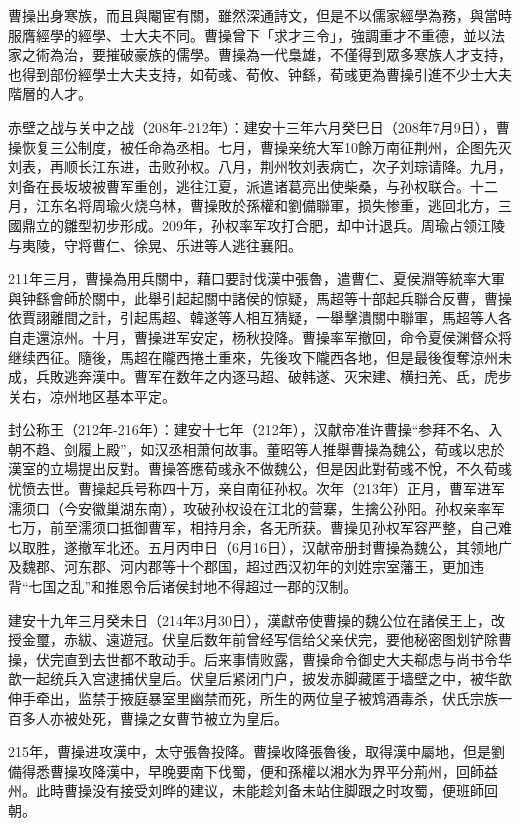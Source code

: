 曹操出身寒族，而且與閹宦有關，雖然深通詩文，但是不以儒家經學為務，與當時服膺經學的經學、士大夫不同。曹操曾下「求才三令」，強調重才不重德，並以法家之術為治，要摧破豪族的儒學。曹操為一代梟雄，不僅得到眾多寒族人才支持，也得到部份經學士大夫支持，如荀彧、荀攸、钟繇，荀彧更為曹操引進不少士大夫階層的人才。

赤壁之战与关中之战（208年-212年）：建安十三年六月癸巳日（208年7月9日），曹操恢复三公制度，被任命為丞相。七月，曹操亲统大军10餘万南征荆州，企图先灭刘表，再顺长江东进，击败孙权。八月，荆州牧刘表病亡，次子刘琮请降。九月，刘备在長坂坡被曹军重创，逃往江夏，派遣诸葛亮出使柴桑，与孙权联合。十二月，江东名将周瑜火烧乌林，曹操敗於孫權和劉備聯軍，损失惨重，逃回北方，三國鼎立的雛型初步形成。209年，孙权率军攻打合肥，却中计退兵。周瑜占领江陵与夷陵，守将曹仁、徐晃、乐进等人逃往襄阳。

211年三月，曹操為用兵關中，藉口要討伐漢中張魯，遣曹仁、夏侯淵等統率大軍與钟繇會師於關中，此舉引起起關中諸侯的惊疑，馬超等十部起兵聯合反曹，曹操依賈詡離間之計，引起馬超、韓遂等人相互猜疑，一舉擊潰關中聯軍，馬超等人各自走還涼州。十月，曹操进军安定，杨秋投降。曹操率军撤回，命令夏侯渊督众将继续西征。隨後，馬超在隴西捲土重來，先後攻下隴西各地，但是最後復奪涼州未成，兵敗逃奔漢中。曹军在数年之内逐马超、破韩遂、灭宋建、横扫羌、氐，虎步关右，凉州地区基本平定。

封公称王（212年-216年）：建安十七年（212年），汉献帝准许曹操“参拜不名、入朝不趋、剑履上殿”，如汉丞相萧何故事。董昭等人推舉曹操為魏公，荀彧以忠於漢室的立場提出反對。曹操答應荀彧永不做魏公，但是因此對荀彧不悅，不久荀彧忧愤去世。曹操起兵号称四十万，亲自南征孙权。次年（213年）正月，曹军进军濡须口（今安徽巢湖东南），攻破孙权设在江北的营寨，生擒公孙阳。孙权亲率军七万，前至濡须口抵御曹军，相持月余，各无所获。曹操见孙权军容严整，自己难以取胜，遂撤军北还。五月丙申日（6月16日），汉献帝册封曹操為魏公，其领地广及魏郡、河东郡、河内郡等十个郡国，超过西汉初年的刘姓宗室藩王，更加违背“七国之乱”和推恩令后诸侯封地不得超过一郡的汉制。

建安十九年三月癸未日（214年3月30日），漢獻帝使曹操的魏公位在諸侯王上，改授金璽，赤紱、遠遊冠。伏皇后数年前曾经写信给父亲伏完，要他秘密图划铲除曹操，伏完直到去世都不敢动手。后来事情败露，曹操命令御史大夫郗虑与尚书令华歆一起统兵入宫逮捕伏皇后。伏皇后紧闭门户，披发赤脚藏匿于墙壁之中，被华歆伸手牵出，监禁于掖庭暴室里幽禁而死，所生的两位皇子被鸩酒毒杀，伏氏宗族一百多人亦被处死，曹操之女曹节被立为皇后。

215年，曹操进攻漢中，太守張魯投降。曹操收降張魯後，取得漢中屬地，但是劉備得悉曹操攻降漢中，早晚要南下伐蜀，便和孫權以湘水为界平分荊州，回師益州。此時曹操没有接受刘晔的建议，未能趁刘备未站住脚跟之时攻蜀，便班師回朝。

